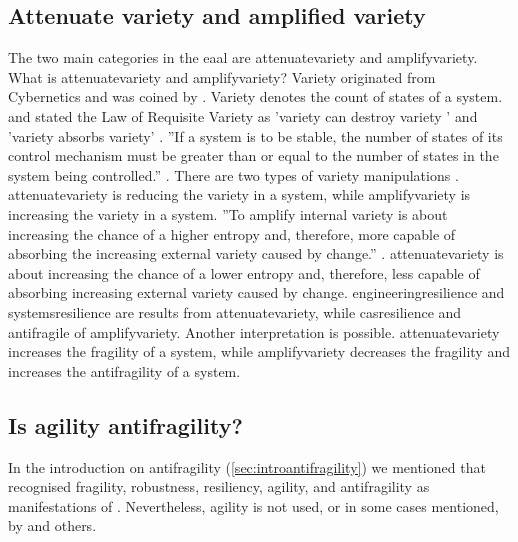 \subsection{Attenuate variety and amplified variety}
\label{sub:attenuatevsaplify}
The two main categories in the \acrlong{eaal} are \gls{attenuatevariety} and \gls{amplifyvariety}. What is \gls{attenuatevariety} and \gls{amplifyvariety}? Variety originated from Cybernetics and was coined by \textcite{Ashby1956}. Variety denotes the count of states of a system. \citeauthor{Ashby1956} and \citeauthor{Beer1979} stated the Law of Requisite Variety as 'variety can destroy variety ' \parencite[p.~207]{Ashby1956} and 'variety absorbs variety' \parencite[p.~286]{Beer1979}. ''If a system is to be stable, the number of states of its control mechanism must be greater than or equal to the number of states in the system being controlled.'' \parencite{Heylighen2001}. There are two types of variety manipulations \parencites{Ashby1956}{Beer1979}. \Gls{attenuatevariety} is reducing the variety in a system, while \gls{amplifyvariety} is increasing the variety in a system. ''To amplify internal variety is about increasing the chance of a higher \gls{entropy} and, therefore, more capable of absorbing the increasing external variety caused by change.'' \parencite[p.~4]{Botjes2021}. \Gls{attenuatevariety} is about increasing the chance of a lower \gls{entropy} and, therefore, less capable of absorbing increasing external variety caused by change. \Gls{engineeringresilience} and \gls{systemsresilience} are results from \gls{attenuatevariety}, while \gls{casresilience} and \gls{antifragile} of \gls{amplifyvariety}. Another interpretation is possible. \Gls{attenuatevariety} increases the \gls{fragility} of a system, while \gls{amplifyvariety} decreases the \gls{fragility} and increases the \gls{antifragility} of a system.
\subsection{Is agility antifragility?}
\label{tb:antifragile_vs_agility}
In the introduction on \gls{antifragility} (\cref{sec:introantifragility}) we mentioned that \textcite[pp.~79--81]{Steen2018} recognised \gls{fragility}, \gls{robustness}, \gls{resiliency}, \gls{agility}, and \gls{antifragility} as manifestations of \textcite{Taleb2012}. Nevertheless, \gls{agility} is not used, or in some cases mentioned, by \textcites{Taleb2012}{Kastner2017}{OReilly2019}{Botjes2021} and others.

